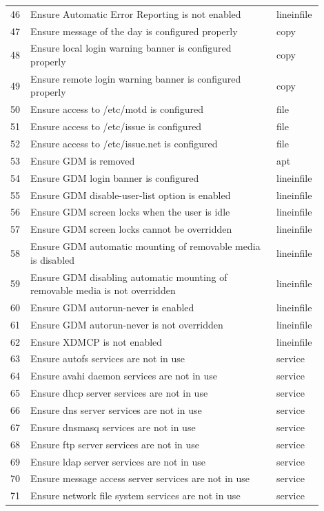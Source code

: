 \begin{longtable}{|p{0.05\linewidth}|p{0.75\linewidth}|p{0.1\linewidth}|}
46 & Ensure Automatic Error Reporting is not enabled & lineinfile \\
47 & Ensure message of the day is configured properly & copy \\
48 & Ensure local login warning banner is configured properly & copy \\
49 & Ensure remote login warning banner is configured properly & copy \\
50 & Ensure access to /etc/motd is configured & file \\
51 & Ensure access to /etc/issue is configured & file \\
52 & Ensure access to /etc/issue.net is configured & file \\
53 & Ensure GDM is removed & apt \\
54 & Ensure GDM login banner is configured & lineinfile \\
55 & Ensure GDM disable-user-list option is enabled & lineinfile \\
56 & Ensure GDM screen locks when the user is idle & lineinfile \\
57 & Ensure GDM screen locks cannot be overridden & lineinfile \\
58 & Ensure GDM automatic mounting of removable media is disabled & lineinfile \\
59 & Ensure GDM disabling automatic mounting of removable media is not overridden & lineinfile \\
60 & Ensure GDM autorun-never is enabled & lineinfile \\
61 & Ensure GDM autorun-never is not overridden & lineinfile \\
62 & Ensure XDMCP is not enabled & lineinfile \\
63 & Ensure autofs services are not in use & service \\
64 & Ensure avahi daemon services are not in use & service \\
65 & Ensure dhcp server services are not in use & service \\
66 & Ensure dns server services are not in use & service \\
67 & Ensure dnsmasq services are not in use & service \\
68 & Ensure ftp server services are not in use & service \\
69 & Ensure ldap server services are not in use & service \\
70 & Ensure message access server services are not in use & service \\
71 & Ensure network file system services are not in use & service \\

\end{longtable}
